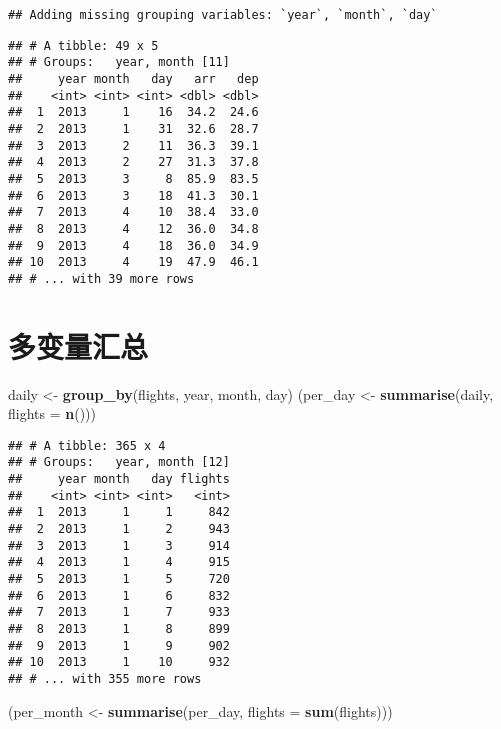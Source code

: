 \documentclass[
]{article}
\newenvironment{Shaded}{\begin{snugshade}}{\end{snugshade}}
\newcommand{\DataTypeTok}[1]{\textcolor[rgb]{0.13,0.29,0.53}{#1}}
\newcommand{\KeywordTok}[1]{\textcolor[rgb]{0.13,0.29,0.53}{\textbf{#1}}}
\newcommand{\NormalTok}[1]{#1}
\newcommand{\StringTok}[1]{\textcolor[rgb]{0.31,0.60,0.02}{#1}}
\begin{document}
\begin{verbatim}
## Adding missing grouping variables: `year`, `month`, `day`
\end{verbatim}

\begin{verbatim}
## # A tibble: 49 x 5
## # Groups:   year, month [11]
##     year month   day   arr   dep
##    <int> <int> <int> <dbl> <dbl>
##  1  2013     1    16  34.2  24.6
##  2  2013     1    31  32.6  28.7
##  3  2013     2    11  36.3  39.1
##  4  2013     2    27  31.3  37.8
##  5  2013     3     8  85.9  83.5
##  6  2013     3    18  41.3  30.1
##  7  2013     4    10  38.4  33.0
##  8  2013     4    12  36.0  34.8
##  9  2013     4    18  36.0  34.9
## 10  2013     4    19  47.9  46.1
## # ... with 39 more rows
\end{verbatim}

\hypertarget{ux591aux53d8ux91cfux6c47ux603b}{%
\section{多变量汇总}\label{ux591aux53d8ux91cfux6c47ux603b}}

\begin{Shaded}
\begin{Highlighting}[]
\NormalTok{daily <-}\StringTok{ }\KeywordTok{group_by}\NormalTok{(flights, year, month, day)}
\NormalTok{(per_day   <-}\StringTok{ }\KeywordTok{summarise}\NormalTok{(daily, }\DataTypeTok{flights =} \KeywordTok{n}\NormalTok{()))}
\end{Highlighting}
\end{Shaded}

\begin{verbatim}
## # A tibble: 365 x 4
## # Groups:   year, month [12]
##     year month   day flights
##    <int> <int> <int>   <int>
##  1  2013     1     1     842
##  2  2013     1     2     943
##  3  2013     1     3     914
##  4  2013     1     4     915
##  5  2013     1     5     720
##  6  2013     1     6     832
##  7  2013     1     7     933
##  8  2013     1     8     899
##  9  2013     1     9     902
## 10  2013     1    10     932
## # ... with 355 more rows
\end{verbatim}

\begin{Shaded}
\begin{Highlighting}[]
\NormalTok{(per_month <-}\StringTok{ }\KeywordTok{summarise}\NormalTok{(per_day, }\DataTypeTok{flights =} \KeywordTok{sum}\NormalTok{(flights)))}
\end{Highlighting}
\end{Shaded}
\end{document}
